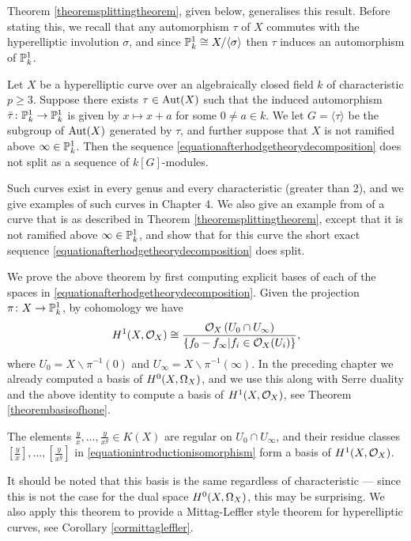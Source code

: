 Theorem \ref{theoremsplittingtheorem}, given below, generalises this result.
Before stating this, we recall that any automorphism $\tau$ of $X$ commutes with the hyperelliptic involution $\sigma$, and since ${\mathbb P}_k^1 \cong X/\langle \sigma \rangle$ then $\tau$ induces an automorphism of ${\mathbb P}_k^1$.
    \begin{unnumthm}
    Let $X$ be a hyperelliptic curve over an algebraically closed field $k$ of characteristic $p \geq 3$.
    Suppose there exists $\tau \in \operatorname{Aut}(X)$ such that the induced automorphism $\bar \tau \colon \mathbb P_k^1 \rightarrow \mathbb P_k^1$ is given by $x \mapsto x+a$ for some $0 \neq a \in k$.
    We let $G = \langle \tau \rangle$ be the subgroup of $\operatorname{Aut}(X)$ generated by $\tau$, and further suppose that $X$ is not ramified above $\infty \in {\mathbb P}_k^1$.
    Then the sequence \eqref{equationafterhodgetheorydecomposition} does not split as a sequence of $k[G]$-modules.
    \end{unnumthm}
Such curves exist in every genus and every characteristic (greater than 2), and we give examples of such curves in Chapter 4. 
We also give an example from \cite{automorphismshyperellipticmodular} of a curve that is as described in Theorem \ref{theoremsplittingtheorem}, except that it is not ramified above $\infty \in {\mathbb P}_k^1$, and show that for this curve the short exact sequence \eqref{equationafterhodgetheorydecomposition} does split.

We prove the above theorem by first computing explicit bases of each of the spaces in \eqref{equationafterhodgetheorydecomposition}.
Given the projection $\pi \colon X \rightarrow {\mathbb P}_k^1$, by \cech cohomology we have
        \begin{equation}\label{equationintroductionisomorphism}
        H^1(X,\mathcal{O}_X) \cong \frac{{\cal O}_X\left(U_0 \cap U_\infty\right)}{\{ f_0 - f_\infty | f_i \in {\cal O}_X(U_i)\}},
        \end{equation}
where $U_0 = X \backslash \pi^{-1}(0)$ and $U_\infty = X \backslash \pi^{-1}(\infty)$.
In the preceding chapter we already computed a basis of ${H^0(X,\Omega_X)}$, and we use this along with Serre duality and the above identity to compute a basis of $H^1(X,\mathcal{O}_X)$, see Theorem \ref{theorembasisofhone}.
    \begin{unnumthm}
    The elements $\frac{y}{x}, \ldots, \frac{y}{x^g} \in K(X)$ are regular on $U_0 \cap U_\infty$, and their residue classes $\left [ \frac{y}{x} \right ],  \ldots, \left [ \frac{y}{x^g} \right]$ in \eqref{equationintroductionisomorphism} form a basis of $H^1(X,\mathcal{O}_X)$.
    \end{unnumthm}
It should be noted that this basis is the same regardless of characteristic --- since this is not the case for the dual space ${H^0(X,\Omega_X)}$, this may be surprising.
We also apply this theorem to provide a Mittag-Leffler style theorem for hyperelliptic curves, see Corollary \ref{cormittagleffler}.

